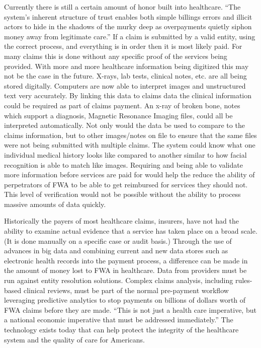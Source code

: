 \documentclass[sigconf]{acmart}
\begin{document}
Currently there is still a certain amount of honor built into healthcare.  ``The system's 
inherent structure of trust enables both simple billings errors and illicit actors to hide 
in the shadows of the murky deep as overpayments quietly siphon money away from legitimate 
care.''\cite{RevCycle}  If a claim is submitted by a valid entity, using the correct process, 
and everything is in order then it is most likely paid.  For many claims this is done 
without any specific proof of the services being provided.  With more and more healthcare 
information being digitized this may not be the case in the future.  X-rays, lab tests, 
clinical notes, etc. are all being stored digitally.  Computers are now able to interpret 
images and unstructured text very accurately.  By linking this data to claims data the clinical 
information could be required as part of claims payment.  An x-ray of broken bone, notes which 
support a diagnosis, Magnetic Resonance Imaging files, could all be interpreted automatically.  
Not only would the data be used to compare to the claims information, but to other images/notes 
on file to ensure that the same files were not being submitted with multiple claims.  The system 
could know what one individual medical history looks like compared to another similar to how 
facial recognition is able to match like images.  Requiring and being able to validate more 
information before services are paid for would help the reduce the ability of perpetrators of FWA 
to be able to get reimbursed for services they should not.  This level of verification would not 
be possible without the ability to process massive amounts of data quickly.  


Historically the payers of most healthcare claims, insurers, have not had the 
ability to examine actual evidence that a service has taken place on a broad scale.  (It is done 
manually on a specific case or audit basis.)  Through the use of advances in big data and combining 
current and new data stores such as electronic health records into the payment process, a difference 
can be made in the amount of money lost to FWA in healthcare.  Data from providers must be run 
against entity resolution solutions.  Complex claims analysis, including rules-based clinical 
reviews, must be part of the normal pre-payment workflow leveraging predictive analytics to 
stop payments on billions of dollars worth of FWA claims before they are made.  ``This is not just 
a health care imperative, but a national economic imperative that must be addressed 
immediately.''\cite{LexisNexis}  The technology exists today that can help protect the
integrity of the healthcare system and the quality of care for Americans. \cite{LexisNexis}
\end{document}
